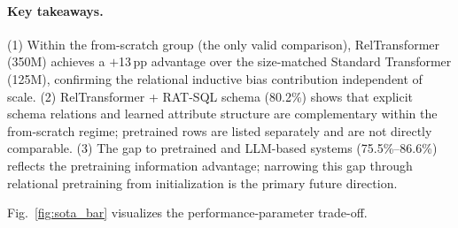 \documentclass[conference]{IEEEtran}
\begin{document}
\paragraph{Key takeaways.}
(1) Within the from-scratch group (the only valid comparison), RelTransformer (350M) achieves a $+$13\,pp advantage over the size-matched Standard Transformer (125M), confirming the relational inductive bias contribution independent of scale.
(2) RelTransformer + RAT-SQL schema (80.2\%) shows that explicit schema relations and learned attribute structure are complementary within the from-scratch regime; pretrained rows are listed separately and are not directly comparable.
(3) The gap to pretrained and LLM-based systems (75.5\%--86.6\%) reflects the pretraining information advantage; narrowing this gap through relational pretraining from initialization is the primary future direction.

Fig.~\ref{fig:sota_bar} visualizes the performance-parameter trade-off.
\end{document}
